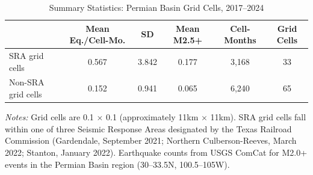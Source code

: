 \begin{table}[htbp]
\centering
\caption{Summary Statistics: Permian Basin Grid Cells, 2017--2024}
\label{tab:summary}
\begin{threeparttable}
\begin{tabular}{lccccc}
\toprule
 & Mean Eq./Cell-Mo. & SD & Mean M2.5+ & Cell-Months & Grid Cells \\
\midrule
SRA grid cells & 0.567 & 3.842 & 0.177 & 3,168 & 33 \\
Non-SRA grid cells & 0.152 & 0.941 & 0.065 & 6,240 & 65 \\
\bottomrule
\end{tabular}
\begin{tablenotes}[flushleft]\small
\item \textit{Notes:} Grid cells are 0.1\textdegree{} $\times$ 0.1\textdegree{} (approximately 11km $\times$ 11km). SRA grid cells fall within one of three Seismic Response Areas designated by the Texas Railroad Commission (Gardendale, September 2021; Northern Culberson-Reeves, March 2022; Stanton, January 2022). Earthquake counts from USGS ComCat for M2.0+ events in the Permian Basin region (30--33.5\textdegree{}N, 100.5--105\textdegree{}W).
\end{tablenotes}
\end{threeparttable}
\end{table}
